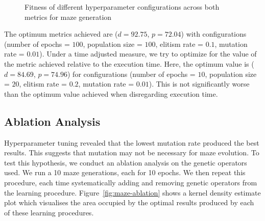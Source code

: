 \begin{figure}[!h]
\centering
            \hfill
            \hfill
            \caption{Fitness of different hyperparameter configurations across both metrics for maze generation}
\label{fig:maze-hyperparam}
\end{figure}

The optimum metrics achieved are ($d=92.75$, $p=72.04$) with configurations (number of epochs = $100$, population size = $100$, elitism rate = $0.1$, mutation rate = $0.01$). Under a time adjusted measure, we try to optimize for the value of the metric achieved relative to the execution time. Here, the optimum value is ($d=84.69$, $p=74.96$) for configurations (number of epochs = $10$, population size = $20$, elitism rate = $0.2$, mutation rate = $0.01$). This is not significantly worse than the optimum value achieved when disregarding execution time.

\subsection{Ablation Analysis} 
Hyperparameter tuning revealed that the lowest mutation rate produced the best results. This suggests that mutation may not be necessary for maze evolution. To test this hypothesis, we conduct an ablation analysis on the genetic operators used. We run a 10 maze generations, each for 10 epochs. We then repeat this procedure, each time systematically adding and removing genetic operators from the learning procedure. Figure~\ref{fig:maze-ablation} shows a kernel density estimate plot which visualises the area occupied by the optimal results produced by each of these learning procedures.\\

